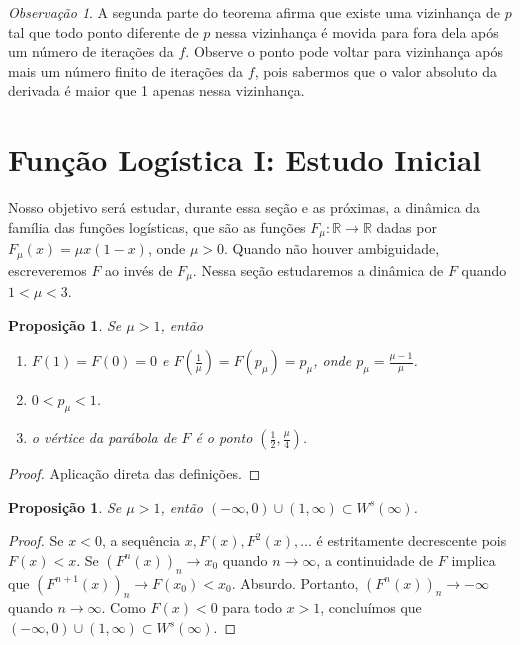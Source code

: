 \documentclass[a4paper, 12pt]{article}
\theoremstyle{definition}
\theoremstyle{plain}
\newtheorem{proposition}[definition]{Proposição}
\theoremstyle{plain}
\theoremstyle{plain}
\theoremstyle{definition}
\theoremstyle{remark}
\newtheorem*{remark}{Observação}
\newcommand{\RR}{\mathbb{R}}
\begin{document}
\begin{remark}
A segunda parte do teorema afirma que existe uma vizinhança de $p$ tal que todo ponto diferente de $p$ nessa vizinhança é movida para fora dela após um número de iterações da $f$. Observe o ponto pode voltar para vizinhança após mais um número finito de iterações da $f$, pois sabermos que o valor absoluto da derivada é maior que 1 apenas nessa vizinhança.
\end{remark}

\section{Função Logística I: Estudo Inicial}

Nosso objetivo será estudar, durante essa seção e as próximas, a dinâmica da família das funções logísticas, que são as funções $F_{\mu}: \RR \to \RR$ dadas por $F_{\mu}(x) = \mu x(1-x)$, onde $\mu > 0$. Quando não houver ambiguidade, escreveremos $F$ ao invés de $F_\mu$. Nessa seção estudaremos a dinâmica de $F$ quando $1 < \mu < 3$.

\begin{proposition}
Se $\mu > 1$, então
\begin{enumerate}
\item $F (1) = F(0) = 0$ e $F(\frac{1}{\mu}) = F(p_\mu) = p_\mu$, onde $p_\mu = \frac{\mu - 1}{\mu}$.
\item $0 < p_\mu < 1$.
\item o vértice da parábola de $F$ é o ponto $(\frac{1}{2}, \frac{\mu}{4})$.
\end{enumerate}
\end{proposition}

\begin{proof}
Aplicação direta das definições.
\end{proof}

\begin{proposition}
\label{proposition 3 1}
Se $\mu > 1$, então $(-\infty, 0) \cup (1, \infty) \subset W^s(\infty)$.
\end{proposition}

\begin{proof}
Se $x < 0$, a sequência  $x, F(x), F^2(x), \dots$ é estritamente decrescente pois  $F(x) < x$. Se $(F^n(x))_n \to x_0$ quando $n \to \infty$, a continuidade de $F$ implica que $(F^{n+1}(x))_n \to F (x_0) < x_0$. Absurdo. Portanto, $(F^n(x))_n \to -\infty$ quando $n \to \infty$. Como $F(x) < 0$ para todo $x > 1$, concluímos que $(-\infty, 0) \cup (1, \infty) \subset W^s(\infty)$.
\end{proof}
\end{document}

